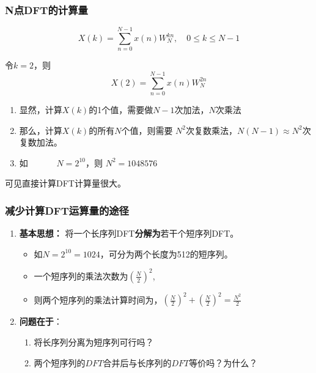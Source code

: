 \documentclass[notheorems,compress,mathserif,table]{beamer}
\begin{document}
\begin{frame}\frametitle{N点DFT的计算量}
$$    X(k)=\sum_{n=0}^{N-1}x(n)W_{N}^{kn},\quad 0\leq k\leq N-1  $$

令$k=2$，则
$$X(2)=\sum_{n=0}^{N-1}x(n)W_{N}^{2n}$$
\begin{enumerate}
  \item 显然，计算$X(k)$的1个值，需要做{\heiti $N-1$次加法，$N$次乘法}
  \item 那么，计算$X(k)$的所有$N$个值，则需要 $N^{2}$次复数乘法，$N(N-1)\approx N^2$次复数加法。
  \item 如$\quad\quad\quad$ $N=2^{10}$，则 $N^{2} = 1048576$
\end{enumerate}
{\heiti \qquad 可见直接计算DFT计算量很大。}
\end{frame}

\begin{frame}\frametitle{减少计算DFT运算量的途径}
\begin{enumerate}
  \item \textbf{基本思想：} 将一个长序列DFT\textbf{分解为}若干个短序列DFT。\newline
  \begin{itemize}
    \item 如$N=2^{10}=1024$，可分为两个长度为512的短序列。 \newline
    \item 一个短序列的乘法次数为$(\frac{N}{2})^{2}$, \newline
    \item 则两个短序列的乘法计算时间为，$(\frac{N}{2})^{2}+(\frac{N}{2})^{2}= \frac{N^{2}}{2}$ \newline
  \end{itemize}
  \item  \textbf{问题在于}：\newline
  \begin{enumerate}
    \item 将长序列分离为短序列可行吗？\newline
    \item 两个短序列的$DFT$合并后与长序列的$DFT$等价吗？为什么？\newline
  \end{enumerate}

\end{enumerate}
\end{frame}
\end{document}
